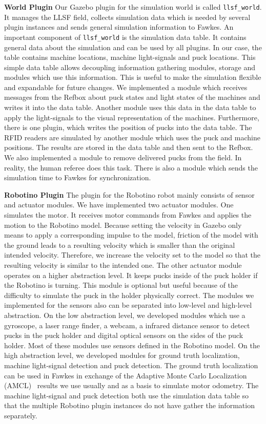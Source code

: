 \textbf{World Plugin}
Our Gazebo plugin for the simulation world is called \texttt{llsf\_world}. It manages the LLSF field, collects simulation data which is needed by several plugin instances and sends general simulation information to Fawkes. An important component of \texttt{llsf\_world} is the simulation data table. It contains general data about the simulation and can be used by all plugins. In our case, the table contains machine locations, machine light-signals and puck locations. This simple data table allows decoupling information gathering modules, storage and modules which use this information. This is useful to make the simulation flexible and expandable for future changes. We implemented a module which receives messages from the Refbox about puck states and light states of the machines and writes it into the data table. Another module uses this data in the data table to apply the light-signals to the visual representation of the machines. Furthermore, there is one plugin, which writes the position of pucks into the data table. The RFID readers are simulated by another module which uses the puck and machine positions. The results are stored in the data table and then sent to the Refbox. We also implemented a module to remove delivered pucks from the field. In reality, the human referee does this task. There is also a module which sends the simulation time to Fawkes for synchronization.

\textbf{Robotino Plugin}
The plugin for the Robotino robot mainly consists of sensor and actuator modules. We have implemented two actuator modules. One simulates the motor. It receives motor commands from Fawkes and applies the motion to the Robotino model. Because setting the velocity in Gazebo only means to apply a corresponding impulse to the model, friction of the model with the ground leads to a resulting velocity which is smaller than the original intended velocity. Therefore, we increase the velocity set to the model so that the resulting velocity is similar to the intended one. The other actuator module operates on a higher abstraction level. It keeps pucks inside of the puck holder if the Robotino is turning. This module is optional but useful because of the difficulty to simulate the puck in the holder physically correct. The modules we implemented for the sensors also can be separated into low-level and high-level abstraction. On the low abstraction level, we developed modules which use a gyroscope, a laser range finder, a webcam, a infrared distance sensor to detect pucks in the puck holder and digital optical sensors on the sides of the puck holder. Most of these modules use sensors defined in the Robotino model. On the high abstraction level, we developed modules for ground truth localization, machine light-signal detection and puck detection. The ground truth localization can be used in Fawkes in exchange of the Adaptive Monte Carlo Localization (AMCL)~\cite{amcl} results we use usually and as a basis to simulate motor odometry. The machine light-signal and puck detection both use the simulation data table so that the multiple Robotino plugin instances do not have gather the information separately.


